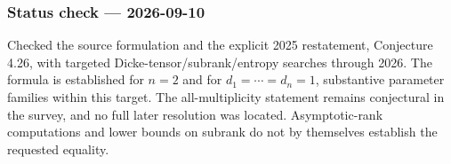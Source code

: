 \documentclass[11pt,a4paper]{article}
\begin{document}
\subsubsection{Status check ---
2026-09-10}\label{status-check-2026-09-10}

Checked the source formulation and the explicit 2025 restatement,
Conjecture 4.26, with targeted Dicke-tensor/subrank/entropy searches
through 2026. The formula is established for \(n=2\) and for
\(d_1=\cdots=d_n=1\), substantive parameter families within this target.
The all-multiplicity statement remains conjectural in the survey, and no
full later resolution was located. Asymptotic-rank computations and
lower bounds on subrank do not by themselves establish the requested
equality.
\end{document}

